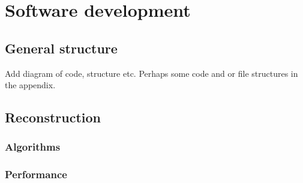 \chapter{Software development}
\label{c:software}

\section{General structure}
Add diagram of code, structure etc. Perhaps some code and or file structures in the appendix.

\section{Reconstruction}
\subsection{Algorithms}
\subsection{Performance}